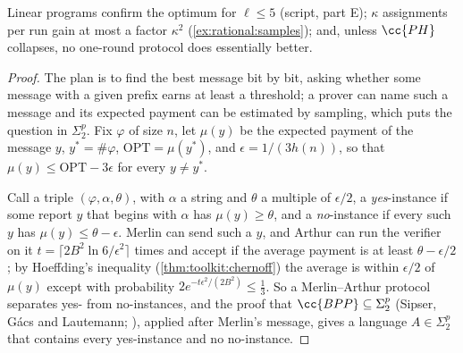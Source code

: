 \begin{refsection}
Linear programs confirm the optimum for $\ell\le5$ (script, part E); $\kappa$ assignments per run gain at most a factor $\kappa^2$ (\cref{ex:rational:samples}); and, unless $\cc{PH}$ collapses, no one-round protocol does essentially better.


\begin{proof}
The plan is to find the best message bit by bit, asking whether some message with a given prefix earns at least a threshold; a prover can name such a message and its expected payment can be estimated by sampling, which puts the question in $\Sigma_2^p$. Fix $\varphi$ of size $n$, let $\mu(y)$ be the expected payment of the message $y$, $y^*=\#\varphi$, $\mathrm{OPT}=\mu(y^*)$, and $\epsilon=1/(3h(n))$, so that $\mu(y)\le\mathrm{OPT}-3\epsilon$ for every $y\ne y^*$.

Call a triple $(\varphi,\alpha,\theta)$, with $\alpha$ a string and $\theta$ a multiple of $\epsilon/2$, a \emph{yes}-instance if some report $y$ that begins with $\alpha$ has $\mu(y)\ge\theta$, and a \emph{no}-instance if every such $y$ has $\mu(y)\le\theta-\epsilon$. Merlin can send such a $y$, and Arthur can run the verifier on it $t=\lceil2B^2\ln6/\epsilon^2\rceil$ times and accept if the average payment is at least $\theta-\epsilon/2$; by Hoeffding's inequality (\cref{thm:toolkit:chernoff}) the average is within $\epsilon/2$ of $\mu(y)$ except with probability $2e^{-t\epsilon^2/(2B^2)}\le\frac13$. So a Merlin--Arthur protocol separates yes- from no-instances, and the proof that $\cc{BPP}\subseteq\Sigma_2^p$ (Sipser, G\'acs and Lautemann; \textcite{AroraBarak2009}), applied after Merlin's message, gives a language $A\in\Sigma_2^p$ that contains every yes-instance and no no-instance.


\end{proof}
\end{refsection}
